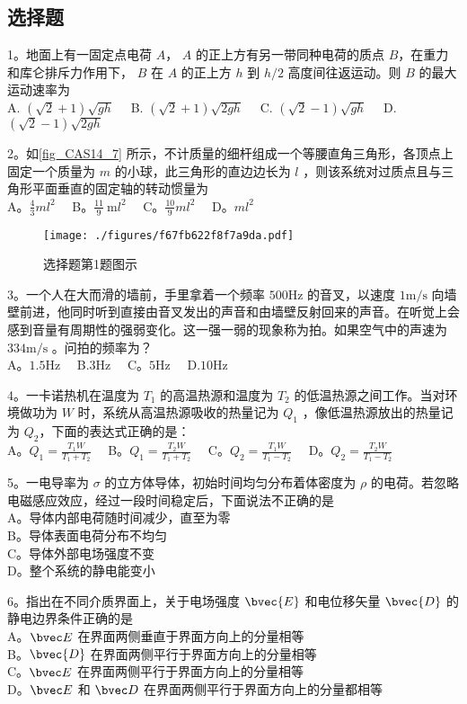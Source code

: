 
\subsection{选择题}
1。地面上有一固定点电荷 $A$， $A$ 的正上方有另一带同种电荷的质点 $B$，在重力和库仑排斥力作用下， $B$ 在 $A$ 的正上方 $h$ 到 $h/2$ 高度间往返运动。则 $B$ 的最大运动速率为\\
A. $(\sqrt{2}+1) \sqrt{g h}\quad$
B. $(\sqrt{2}+1) \sqrt{2 g h}\quad$
C. $(\sqrt{2}-1) \sqrt{g h}\quad$
D. $(\sqrt{2}-1) \sqrt{2 g h}$

2。如\autoref{fig_CAS14_7} 所示，不计质量的细杆组成一个等腰直角三角形，各顶点上固定一个质量为 $m$ 的小球，此三角形的直边边长为 $l$ ，则该系统对过质点且与三角形平面垂直的固定轴的转动惯量为\\
A。$\frac{4}{3} m l^{2}\quad$
B。$\frac{11}{9} \mathrm{~m} l^{2}\quad$
C。$\frac{10}{9} m l^{2}\quad$
D。$ml^{2}$
\begin{figure}[ht]
\centering
\texttt{[image: ./figures/f67fb622f8f7a9da.pdf]}
\caption{选择题第1题图示} \label{fig_CAS14_7}
\end{figure}
3。一个人在大而滑的墙前，手里拿着一个频率 $500\mathrm{Hz}$ 的音叉，以速度 $1\mathrm{m/s}$ 向墙壁前进，他同时听到直接由音叉发出的声音和由墙壁反射回来的声音。在听觉上会感到音量有周期性的强弱变化。这一强一弱的现象称为拍。如果空气中的声速为 $334\mathrm{m/s}$ 。问拍的频率为？\\
A。$1.5\mathrm{Hz}\quad$ B.$3\mathrm{Hz}\quad$ C。$5\mathrm{Hz}\quad$ D.$10\mathrm{Hz}$

4。一卡诺热机在温度为 $T_1$ 的高温热源和温度为 $T_2$ 的低温热源之间工作。当对环境做功为 $W$ 时，系统从高温热源吸收的热量记为 $Q_1$ ，像低温热源放出的热量记为 $Q_2$，下面的表达式正确的是：\\

A。$Q_1=\frac{T_1W}{T_1+T_2}\quad$ B。$Q_1=\frac{T_2W}{T_1+T_2}\quad$ C。$Q_2=\frac{T_1W}{T_1-T_2}\quad$ D。$Q_2=\frac{T_2W}{T_1-T_2}$

5。一电导率为 $\sigma$ 的立方体导体，初始时间均匀分布着体密度为 $\rho$ 的电荷。若忽略电磁感应效应，经过一段时间稳定后，下面说法不正确的是\\
A。导体内部电荷随时间减少，直至为零\\
B。导体表面电荷分布不均匀\\
C。导体外部电场强度不变\\
D。整个系统的静电能变小

6。指出在不同介质界面上，关于电场强度 $\bvec{E}$ 和电位移矢量 $\bvec{D}$ 的静电边界条件正确的是\\
A。$\bvec E$ 在界面两侧垂直于界面方向上的分量相等\\
B。$\bvec{D}$ 在界面两侧平行于界面方向上的分量相等\\
C。$\bvec E$ 在界面两侧平行于界面方向上的分量相等\\
D。$\bvec E$ 和 $\bvec D$ 在界面两侧平行于界面方向上的分量都相等

